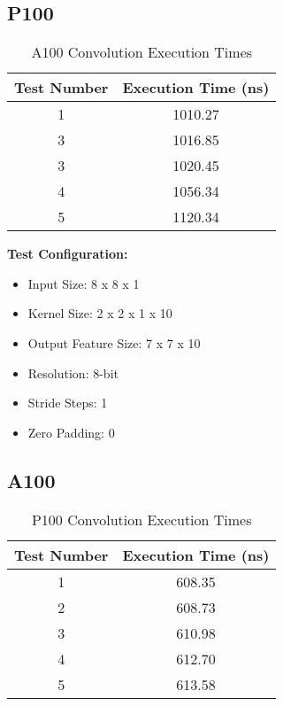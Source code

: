 \subsection{P100}
\begin{table}[h]
    \centering
    \begin{tabular}{|c|c|}
        \hline
        \textbf{Test Number} & \textbf{Execution Time (ns)} \\
        \hline
        1 & 1010.27 \\
        3 & 1016.85 \\
        3 & 1020.45 \\
        4 & 1056.34 \\
        5 & 1120.34 \\
        \hline
    \end{tabular}
    \caption{A100 Convolution Execution Times}
    \label{tab:a100_conv_times}
\end{table}

\textbf{Test Configuration:}
\begin{itemize}
    \item Input Size: 8 x 8 x 1
    \item Kernel Size: 2 x 2 x 1 x 10
    \item Output Feature Size: 7 x 7 x 10
    \item Resolution: 8-bit
    \item Stride Steps: 1
    \item Zero Padding: 0
\end{itemize}

\subsection{A100}
\begin{table}[h]
    \centering
    \begin{tabular}{|c|c|}
        \hline
        \textbf{Test Number} & \textbf{Execution Time (ns)} \\
        \hline
        1 & 608.35 \\
        2 & 608.73 \\
        3 & 610.98 \\
        4 & 612.70 \\
        5 & 613.58 \\
        \hline
    \end{tabular}
    \caption{P100 Convolution Execution Times}
    \label{tab:p100_conv_times}
\end{table}

